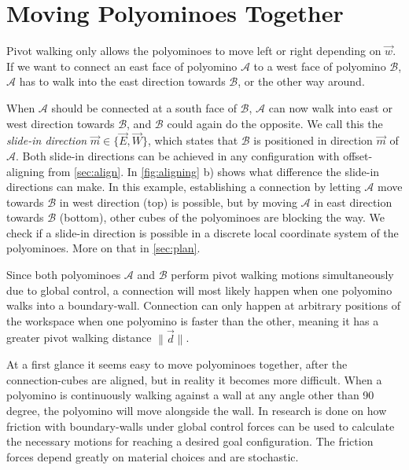 \section{Moving Polyominoes Together}
\label{sec:walk_wait}

Pivot walking only allows the polyominoes to move left or right depending on $\vec{w}$.
If we want to connect an east face of polyomino $\mathcal{A}$ to a west face of polyomino $\mathcal{B}$, $\mathcal{A}$ has to walk into the east direction towards $\mathcal{B}$, or the other way around.

When $\mathcal{A}$ should be connected at a south face of $\mathcal{B}$, $\mathcal{A}$ can now walk into east or west direction towards $\mathcal{B}$, and $\mathcal{B}$ could again do the opposite.
We call this the \textit{slide-in direction} $\vec{m} \in \{\vec{E}, \vec{W}\}$, which states that $\mathcal{B}$ is positioned in direction $\vec{m}$ of $\mathcal{A}$.
Both slide-in directions can be achieved in any configuration with offset-aligning from \autoref{sec:align}.
In \autoref{fig:aligning} b) shows what difference the slide-in directions can make.
In this example, establishing a connection by letting $\mathcal{A}$ move towards $\mathcal{B}$ in west direction (top) is possible, but by moving $\mathcal{A}$ in east direction towards $\mathcal{B}$ (bottom), other cubes of the polyominoes are blocking the way.
We check if a slide-in direction is possible in a discrete local coordinate system of the polyominoes.
More on that in \autoref{sec:plan}.

Since both polyominoes $\mathcal{A}$ and $\mathcal{B}$ perform pivot walking motions simultaneously due to global control, a connection will most likely happen when one polyomino walks into a boundary-wall.
Connection can only happen at arbitrary positions of the workspace when one polyomino is faster than the other, meaning it has a greater pivot walking distance $\lVert \vec{d} \rVert$.

At a first glance it seems easy to move polyominoes together, after the connection-cubes are aligned, but in reality it becomes more difficult.
When a polyomino is continuously walking against a wall at any angle other than 90 degree, the polyomino will move alongside the wall.
In \cite{schmidt2020} research is done on how friction with boundary-walls under global control forces can be used to calculate the necessary motions for reaching a desired goal configuration.
The friction forces depend greatly on material choices and are stochastic.

